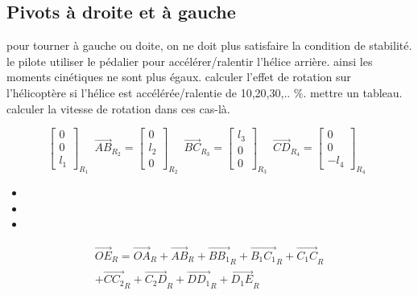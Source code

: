 \documentclass[12pt,a4paper]{article}
\begin{document}
\subsection{Pivots à droite et à gauche}
pour tourner à gauche ou doite, on ne doit plus satisfaire la condition de stabilité. le pilote utiliser le pédalier pour accélérer/ralentir l'hélice arrière. ainsi les moments cinétiques ne sont plus égaux.
\medbreak
calculer l'effet de rotation sur l'hélicoptère si l'hélice est accélérée/ralentie de 10,20,30,.. $\%$. mettre un tableau. calculer la vitesse de rotation dans ces cas-là.


\begin{equation}
    \begin{bmatrix}
        0 \\
        0\\
        l_1
    \end{bmatrix}_{R_{1}} \enspace
    \vec{AB}_{R_{2}}=
    \begin{bmatrix}
        0 \\
        l_2\\
        0
    \end{bmatrix}_{R_{2}} \enspace
    \vec{BC}_{R_{3}}=
    \begin{bmatrix}
        l_3 \\
        0\\
        0
    \end{bmatrix}_{R_{3}} \enspace
    \vec{CD}_{R_{4}}=
    \begin{bmatrix}
        0 \\
        0\\
        -l_4
    \end{bmatrix}_{R_{4}} \enspace
\end{equation}

\begin{itemize}
    \item
    \item
    \item
\end{itemize}


\medbreak

\medbreak

\medbreak

\medbreak




\begin{equation}
    \begin{split}
        \vec{OE}_R=\vec{OA}_R+\vec{AB}_R+\vec{B B_1}_R+\vec{B_1 C_1}_R+\vec{C_1 C}_R\\+\vec{C C_2}_R+\vec{C_2 D}_R+\vec{D D_1}_R+\vec{D_1 E}_R
    \end{split}
\end{equation}
\end{document}
